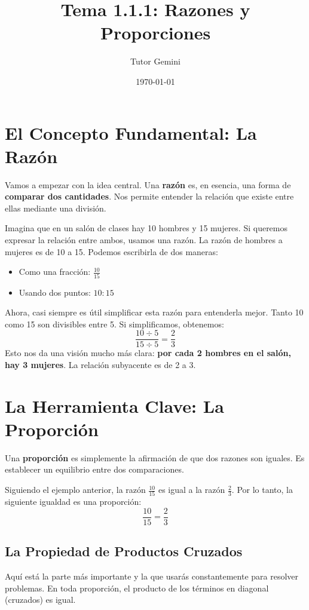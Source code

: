 \documentclass[12pt,a4paper]{article}
\title{\textbf{\Large Tema 1.1.1: Razones y Proporciones}}
\author{Tutor Gemini}
\date{\today}
\begin{document}
\maketitle

\section{El Concepto Fundamental: La Raz\'{o}n}

Vamos a empezar con la idea central. Una \textbf{raz\'{o}n} es, en esencia, una forma de \textbf{comparar dos cantidades}. Nos permite entender la relaci\'{o}n que existe entre ellas mediante una divisi\'{o}n.

Imagina que en un sal\'{o}n de clases hay 10 hombres y 15 mujeres. Si queremos expresar la relaci\'{o}n entre ambos, usamos una raz\'{o}n. La raz\'{o}n de hombres a mujeres es de 10 a 15. Podemos escribirla de dos maneras:
\begin{itemize}
    \item Como una fracci\'{o}n: $ \frac{10}{15} $
    \item Usando dos puntos: $ 10 : 15 $
\end{itemize}

Ahora, casi siempre es \'{u}til simplificar esta raz\'{o}n para entenderla mejor. Tanto 10 como 15 son divisibles entre 5. Si simplificamos, obtenemos:
$$ \frac{10 \div 5}{15 \div 5} = \frac{2}{3} $$
Esto nos da una visi\'{o}n mucho m\'{a}s clara: \textbf{por cada 2 hombres en el sal\'{o}n, hay 3 mujeres}. La relaci\'{o}n subyacente es de 2 a 3.

\section{La Herramienta Clave: La Proporci\'{o}n}

Una \textbf{proporci\'{o}n} es simplemente la afirmaci\'{o}n de que dos razones son iguales. Es establecer un equilibrio entre dos comparaciones.

Siguiendo el ejemplo anterior, la raz\'{o}n $ \frac{10}{15} $ es igual a la raz\'{o}n $ \frac{2}{3} $. Por lo tanto, la siguiente igualdad es una proporci\'{o}n:
$$ \frac{10}{15} = \frac{2}{3} $$

\subsection*{La Propiedad de Productos Cruzados}

Aqu\'{i} est\'{a} la parte m\'{a}s importante y la que usar\'{a}s constantemente para resolver problemas. En toda proporci\'{o}n, el producto de los t\'{e}rminos en diagonal (cruzados) es igual.
\end{document}
